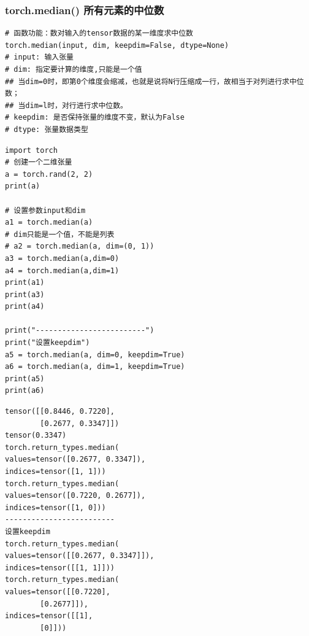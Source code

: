 \subsubsection{torch.median() 所有元素的中位数}
\label{subsubsec:Pytorch-torch.median}
\begin{lstlisting}[style=demostyle,numbers=none]
# 函数功能：数对输入的tensor数据的某一维度求中位数
torch.median(input, dim, keepdim=False, dtype=None)
# input: 输入张量
# dim: 指定要计算的维度,只能是一个值
## 当dim=0时，即第0个维度会缩减，也就是说将N行压缩成一行，故相当于对列进行求中位数；
## 当dim=l时，对行进行求中位数。
# keepdim: 是否保持张量的维度不变，默认为False
# dtype: 张量数据类型
\end{lstlisting}
\begin{lstlisting}[style=pythonstyle]
import torch
# 创建一个二维张量
a = torch.rand(2, 2)
print(a)

# 设置参数input和dim
a1 = torch.median(a)
# dim只能是一个值，不能是列表
# a2 = torch.median(a, dim=(0, 1)) 
a3 = torch.median(a,dim=0)
a4 = torch.median(a,dim=1)
print(a1)
print(a3)
print(a4)

print("-------------------------")
print("设置keepdim")
a5 = torch.median(a, dim=0, keepdim=True)
a6 = torch.median(a, dim=1, keepdim=True)
print(a5)
print(a6)
\end{lstlisting}
\begin{lstlisting}[style=demostyle,numbers=none]
tensor([[0.8446, 0.7220],
        [0.2677, 0.3347]])
tensor(0.3347)
torch.return_types.median(
values=tensor([0.2677, 0.3347]),
indices=tensor([1, 1]))
torch.return_types.median(
values=tensor([0.7220, 0.2677]),
indices=tensor([1, 0]))
-------------------------
设置keepdim
torch.return_types.median(
values=tensor([[0.2677, 0.3347]]),
indices=tensor([[1, 1]]))
torch.return_types.median(
values=tensor([[0.7220],
        [0.2677]]),
indices=tensor([[1],
        [0]]))
\end{lstlisting}

